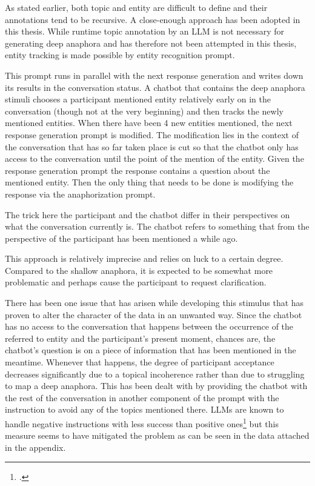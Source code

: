 \documentclass[12pt]{report}
\begin{document}
{\par
As stated earlier,
both topic and entity are difficult to define
and their annotations tend to be recursive.
A close-enough approach has been adopted in this thesis.
While runtime topic annotation by an LLM
is not necessary for generating deep anaphora
and has therefore not been attempted in this thesis,
entity tracking is made possible by
entity recognition prompt.

This prompt runs in parallel with the next response generation
and writes down its results in the conversation status.
A chatbot that contains the deep anaphora stimuli
chooses a participant mentioned entity
relatively early on in the conversation
(though not at the very beginning)
and then tracks the newly mentioned entities.
When there have been 4 new entities mentioned,
the next response generation prompt is modified.
The modification lies in the context of the conversation
that has so far taken place is cut so
that the chatbot only has access
to the conversation until the point of the mention of the entity.
Given the response generation prompt
the response contains a question
about the mentioned entity.
Then the only thing that needs to be done
is modifying the response via the anaphorization prompt.

The trick here the participant and the chatbot differ in their perspectives
on what the conversation currently is.
The chatbot refers to something
that from the perspective of the participant
has been mentioned a while ago.

This approach is relatively imprecise and relies on luck to a certain degree.
Compared to the shallow anaphora,
it is expected to be somewhat more problematic
and perhaps cause the participant to request clarification.

\par
There has been one issue that has arisen while developing this stimulus
that has proven to alter the character of the data in an unwanted way.
Since the chatbot has no access to the conversation that happens
between the occurrence of the referred to entity and the participant's present moment,
chances are, the chatbot's question is on
a piece of information that has been mentioned in the meantime.
Whenever that happens, the degree of participant acceptance decreases significantly
due to a topical incoherence rather than
due to struggling to map a deep anaphora.
This has been dealt with by providing the chatbot
with the rest of the conversation in another component of the prompt
with the instruction to avoid any of the topics mentioned there.
LLMs are known to handle negative instructions with less success than positive ones\footcite{negated_prompts}
but this measure seems to have mitigated the problem
as can be seen in the data attached in the appendix.

}
\end{document}
